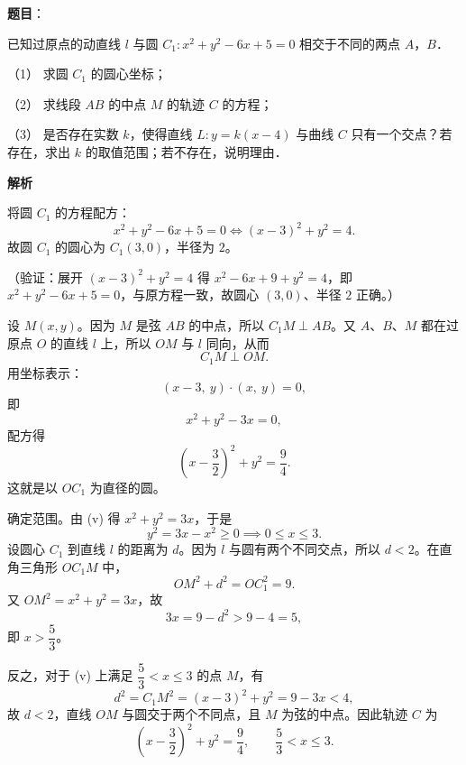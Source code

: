 \begin{answer}

\textbf{题目}：

已知过原点的动直线 \(l\) 与圆 \(C_1: x^2+y^2-6x+5=0\) 相交于不同的两点 \(A\)，\(B\)．

（1） 求圆 \(C_1\) 的圆心坐标；

（2） 求线段 \(AB\) 的中点 \(M\) 的轨迹 \(C\) 的方程；

（3） 是否存在实数 \(k\)，使得直线 \(L: y=k(x-4)\) 与曲线 \(C\) 只有一个交点？若存在，求出 \(k\) 的取值范围；若不存在，说明理由．

\textbf{解析}


将圆 \(C_1\) 的方程配方：
\nopagebreak[4]
\[
x^2+y^2-6x+5=0\iff (x-3)^2+y^2=4.
\]
故圆 \(C_1\) 的圆心为 \(C_1(3,0)\)，半径为 \(2\)。

（验证：展开 \((x-3)^2+y^2=4\) 得 \(x^2-6x+9+y^2=4\)，即 \(x^2+y^2-6x+5=0\)，与原方程一致，故圆心 \((3,0)\)、半径 \(2\) 正确。）


设 \(M(x,y)\)。因为 \(M\) 是弦 \(AB\) 的中点，所以 \(C_1M\perp AB\)。又 \(A\)、\(B\)、\(M\) 都在过原点 \(O\) 的直线 \(l\) 上，所以 \(OM\) 与 \(l\) 同向，从而
\nopagebreak[4]
\[
C_1M\perp OM.
\]
用坐标表示：
\nopagebreak[4]
\[
(x-3,\ y)\cdot(x,\ y)=0,
\]
即
\nopagebreak[4]
\[
x^2+y^2-3x=0,
\]
配方得
\nopagebreak[4]
\[
\left(x-\dfrac32\right)^2+y^2=\dfrac94. \tag*{(v)}
\]
这就是以 \(OC_1\) 为直径的圆。

确定范围。由 (v) 得 \(x^2+y^2=3x\)，于是
\nopagebreak[4]
\[
y^2=3x-x^2\geqslant0\implies 0\leqslant x\leqslant3.
\]
设圆心 \(C_1\) 到直线 \(l\) 的距离为 \(d\)。因为 \(l\) 与圆有两个不同交点，所以 \(d<2\)。在直角三角形 \(OC_1M\) 中，
\nopagebreak[4]
\[
OM^2+d^2=OC_1^2=9.
\]
又 \(OM^2=x^2+y^2=3x\)，故
\nopagebreak[4]
\[
3x=9-d^2>9-4=5,
\]
即 \(x>\dfrac53\)。

反之，对于 (v) 上满足 \(\dfrac53<x\leqslant3\) 的点 \(M\)，有
\nopagebreak[4]
\[
d^2=C_1M^2=(x-3)^2+y^2=9-3x<4,
\]
故 \(d<2\)，直线 \(OM\) 与圆交于两个不同点，且 \(M\) 为弦的中点。因此轨迹 \(C\) 为
\nopagebreak[4]
\[
\left(x-\dfrac32\right)^2+y^2=\dfrac94,\qquad \dfrac53<x\leqslant3.
\]


\end{answer}
